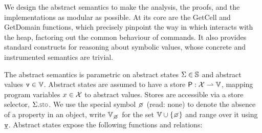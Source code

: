 %

 We design the abstract semantics to make the analysis, the proofs, and the implementations as modular as possible. At its core are the GetCell and GetDomain functions, which precisely pinpoint the way in which \jsil interacts with the heap, factoring out the common behaviour of \jsil commands. It also provides standard constructs for reasoning about symbolic values, whose concrete and instrumented semantics are trivial.

The abstract semantics is parametric on abstract states $\Sigma \in \mathbb{S}$ and abstract values $\mathtt{v} \in \mathbb{V}$.
Abstract states are assumed to have a store ${\sf P}: \mathcal{X} \rightharpoonup \mathbb{V}$, mapping program variables $x \in \mathcal{X}$ to abstract values. Stores are accessible via a store selector, $\absstate.\stosel$.
We use the special symbol $\none$ (read: none) to denote the absence of a property in an object, write $\setext{\absvals}{\none}$ for the set $\absvals \cup \{ \none \}$ and range over it using~$\underline{\mathtt{v}}$.
Abstract states expose the following functions and relations: 
